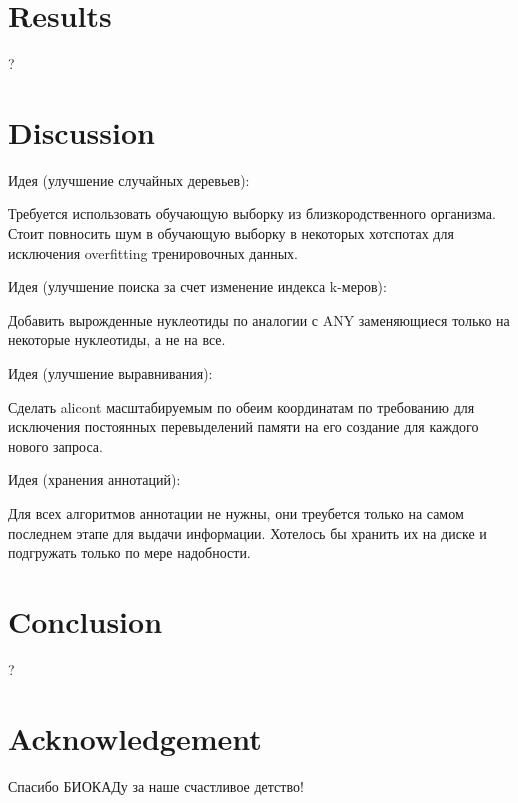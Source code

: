 \documentclass[a4paper,12pt]{article}
\begin{document}
  \section{Results}

  ?

  \section{Discussion}

  Идея (улучшение случайных деревьев):

  Требуется использовать обучающую выборку из близкородственного
  организма. Стоит повносить шум в обучающую выборку в некоторых
  хотспотах для исключения overfitting тренировочных данных.

  Идея (улучшение поиска за счет изменение индекса k-меров):

  Добавить вырожденные нуклеотиды по аналогии с ANY заменяющиеся
  только на некоторые нуклеотиды, а не на все.

  Идея (улучшение выравнивания):

  Сделать alicont масштабируемым по обеим координатам по требованию
  для исключения постоянных перевыделений памяти на его создание для
  каждого нового запроса.

  Идея (хранения аннотаций):

  Для всех алгоритмов аннотации не нужны, они треубется только на
  самом последнем этапе для выдачи информации. Хотелось бы хранить их
  на диске и подгружать только по мере надобности.

  \section{Conclusion}

  ?

  \section{Acknowledgement}

  Спасибо БИОКАДу за наше счастливое детство!
\end{document}
